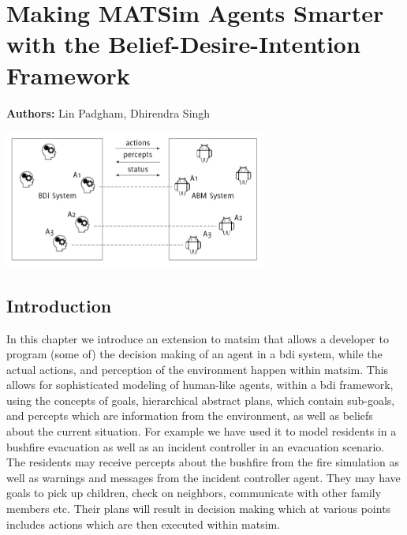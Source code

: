 \chapter{Making MATSim Agents Smarter with the Belief-Desire-Intention Framework}
\label{ch:bdi}

\hfill \textbf{Authors:} Lin Padgham, Dhirendra Singh

\begin{center} \includegraphics[width=0.65\textwidth, angle=0]{extending/figures/bdi/title.png} \end{center}


\section{Introduction}
\label{sec:bdi-intro}
In this chapter we introduce an extension to \gls{matsim} that allows a
developer to program (some of) the decision making of an agent in a \gls{bdi} system, while the actual actions, and
perception of the environment happen within \gls{matsim}. This allows for
sophisticated modeling of human-like agents, within a \gls{bdi}
framework, using the concepts of goals, hierarchical abstract plans,
which contain sub-goals, and percepts which are information from the
environment, as well as beliefs about the current situation. For
example we have used it to model residents in a 
bushfire evacuation as well as an incident controller in an evacuation
scenario. The residents may receive percepts about the bushfire from
the fire simulation as well as warnings and messages from the incident
controller agent. They may
have goals to pick up children, check on neighbors, communicate with
other family members etc. Their plans will result in
decision making which at various points includes actions which are then
executed within \gls{matsim}.

